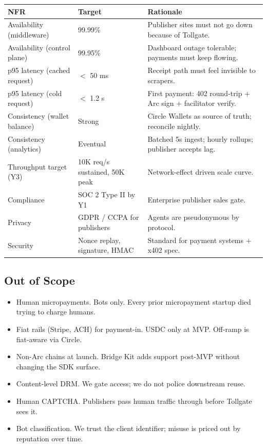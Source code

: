 \documentclass[11pt,a4paper]{article}
\begin{document}
\begin{table}[H]
\centering
\footnotesize
\begin{tabularx}{\textwidth}{@{} l l X @{}}
\toprule
\textbf{NFR} & \textbf{Target} & \textbf{Rationale} \\
\midrule
Availability (middleware) & 99.99\% & Publisher sites must not go down because of Tollgate. \\
Availability (control plane) & 99.95\% & Dashboard outage tolerable; payments must keep flowing. \\
p95 latency (cached request) & $<$ 50 ms & Receipt path must feel invisible to scrapers. \\
p95 latency (cold request) & $<$ 1.2 s & First payment: 402 round-trip + Arc sign + facilitator verify. \\
Consistency (wallet balance) & Strong & Circle Wallets as source of truth; reconcile nightly. \\
Consistency (analytics) & Eventual & Batched 5s ingest; hourly rollups; publisher accepts lag. \\
Throughput target (Y3) & 10K req/s sustained, 50K peak & Network-effect driven scale curve. \\
Compliance & SOC 2 Type II by Y1 & Enterprise publisher sales gate. \\
Privacy & GDPR / CCPA for publishers & Agents are pseudonymous by protocol. \\
Security & Nonce replay, signature, HMAC & Standard for payment systems + x402 spec. \\
\bottomrule
\end{tabularx}
\end{table}

\subsection{Out of Scope}

\begin{itemize}[leftmargin=*]
  \item Human micropayments. Bots only. Every prior micropayment startup died trying to charge humans.
  \item Fiat rails (Stripe, ACH) for payment-in. USDC only at MVP. Off-ramp is fiat-aware via Circle.
  \item Non-Arc chains at launch. Bridge Kit adds support post-MVP without changing the SDK surface.
  \item Content-level DRM. We gate access; we do not police downstream reuse.
  \item Human CAPTCHA. Publishers pass human traffic through before Tollgate sees it.
  \item Bot classification. We trust the client identifier; misuse is priced out by reputation over time.
\end{itemize}
\end{document}

